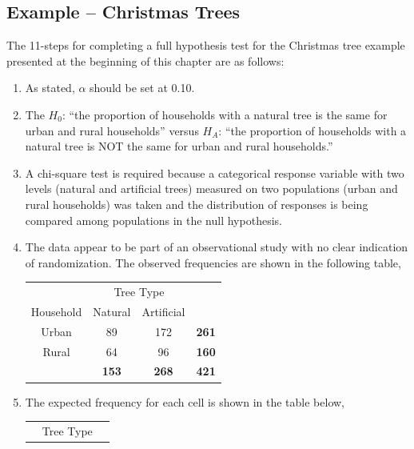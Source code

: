 \documentclass[10pt,openany]{book}\usepackage[]{graphicx}\usepackage[]{color}
\begin{document}
\subsection{Example -- Christmas Trees}
The 11-steps  for completing a full hypothesis test for the Christmas tree example presented at the beginning of this chapter are as follows:
  \begin{enumerate}
    \item As stated, $\alpha$ should be set at 0.10.
    \item The $H_{0}$: ``the proportion of households with a natural tree is the same for urban and rural households'' versus $H_{A}$: ``the proportion of households with a natural tree is NOT the same for urban and rural households.''
    \item A chi-square test is required because a categorical response variable with two levels (natural and artificial trees) measured on two populations (urban and rural households) was taken and the distribution of responses is being compared among populations in the null hypothesis.
    \item The data appear to be part of an observational study with no clear indication of randomization.  The observed frequencies are shown in the following table,
      \begin{center}
        \begin{tabular}{c|c|c|c|}
          \multicolumn{1}{c}{} & \multicolumn{2}{c}{Tree Type} & \multicolumn{1}{c}{} \\
          \cline{2-3}
          Household & Natural & Artificial & \multicolumn{1}{c}{} \\
          \hline
          \multicolumn{1}{|c|}{Urban} & 89 & 172 & \textbf{261} \\
          \hline
          \multicolumn{1}{|c|}{Rural} & 64 & 96 & \textbf{160} \\
          \hline
           & \textbf{153} & \textbf{268} & \textbf{421} \\
          \cline{2-4}
        \end{tabular}
      \end{center}
    \item The expected frequency for each cell is shown in the table below,
      \begin{center}
        \begin{tabular}{c|c|c|c|}
          \multicolumn{1}{c}{} & \multicolumn{2}{c}{Tree Type} & \multicolumn{1}{c}{} \\

\end{tabular}
\end{center}
\end{enumerate}
\end{document}
